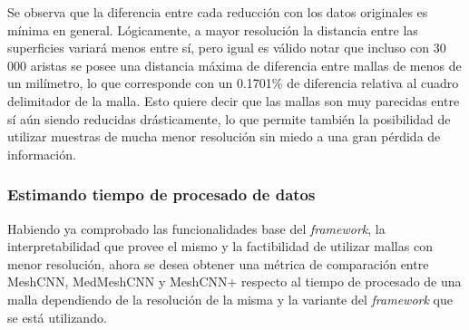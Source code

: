 \begin{table}[h]
\centering
{}
\caption[Distancia Hausdorff entre las mallas originales y las mallas reducidas]{Distancia Hausdorff entre las mallas originales y las mallas reducidas, medidas en unidades absolutas y relativas.}
\label{table:hausdorff}
\end{table}

Se observa que la diferencia entre cada reducción con los datos originales es mínima en general. Lógicamente, a mayor resolución la distancia entre las superficies variará menos entre sí, pero igual es válido notar que incluso con 30 000 aristas se posee una distancia máxima de diferencia entre mallas de menos de un milímetro, lo que corresponde con un 0.1701\% de diferencia relativa al cuadro delimitador de la malla. Esto quiere decir que las mallas son muy parecidas entre sí aún siendo reducidas drásticamente, lo que permite también la posibilidad de utilizar muestras de mucha menor resolución sin miedo a una gran pérdida de información.

\subsubsection{Estimando tiempo de procesado de datos}
Habiendo ya comprobado las funcionalidades base del \textit{framework}, la interpretabilidad que provee el mismo y la factibilidad de utilizar mallas con menor resolución, ahora se desea obtener una métrica de comparación entre MeshCNN, MedMeshCNN y MeshCNN+ respecto al tiempo de procesado de una malla dependiendo de la resolución de la misma y la variante del \textit{framework} que se está utilizando.

